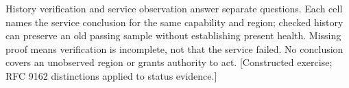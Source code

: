 \documentclass[11pt]{article}\usepackage[paperwidth=7in,paperheight=10in,textwidth=4.5in,textheight=8in,centering]{geometry}
\begin{document}
\begin{center}

\end{center}\medskip\noindent\footnotesize\raggedright History verification and service observation answer separate questions. Each cell names the service conclusion for the same capability and region; checked history can preserve an old passing sample without establishing present health. Missing proof means verification is incomplete, not that the service failed. No conclusion covers an unobserved region or grants authority to act. [Constructed exercise; RFC 9162 distinctions applied to status evidence.]
\end{document}
